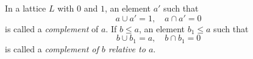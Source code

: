 In a lattice $L$ with $0$ and $1$, an element $a'$ such that
$$a \cup a' = 1, \quad a \cap a' = 0$$
is called a \emph{complement} of $a$. If $b \leq a$, an element $b_1 \leq a$ such that
$$b \cup b_1 = a, \quad b \cap b_1 = 0$$
is called a \emph{complement of $b$ relative to $a$}.

